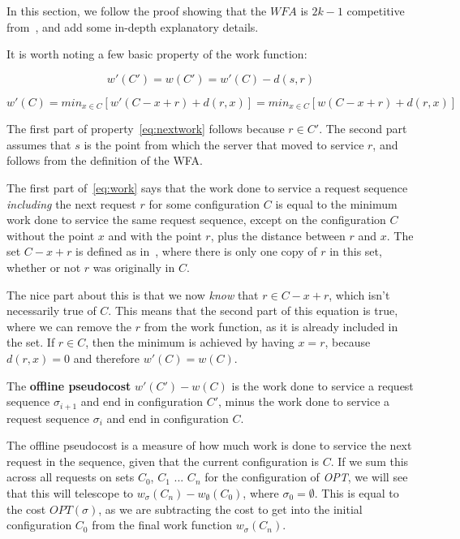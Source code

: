 In this section, we follow the proof showing that the $WFA$ is $2k-1$ competitive from~\cite{OnlineComp1998}, and add some in-depth explanatory details. 

It is worth noting a few basic property of the work function:

\begin{equation}
    \label{eq:nextwork}
    w'(C') = w(C') = w'(C) - d(s,r)
\end{equation}

\begin{equation}
    \label{eq:work}
    w'(C) = min_{x \in C} [w'(C - x + r) + d(r, x)] = min_{x \in C} [w(C - x + r) + d(r, x)]
\end{equation}

The first part of property~\ref{eq:nextwork} follows because $r \in C'$. The second part assumes that $s$ is the point from which the server that moved to service $r$, and follows from the definition of the WFA.

The first part of~\ref{eq:work} says that the work done to service a request sequence \textit{including} the next request $r$ for some configuration $C$ is equal to the minimum work done to service the same request sequence, except on the configuration $C$ without the point $x$ and with the point $r$, plus the distance between $r$ and $x$. The set $C-x+r$ is defined as in~\cite{OnlineComp1998}, where there is only one copy of $r$ in this set, whether or not $r$ was originally in $C$. 

The nice part about this is that we now \textit{know} that $r \in C - x + r$, which isn't necessarily true of $C$. This means that the second part of this equation is true, where we can remove the $r$ from the work function, as it is already included in the set. If $r \in C$, then the minimum is achieved by having $x = r$, because $d(r,x) = 0$ and therefore $w'(C) = w(C)$.

\begin{definition}
    The \textbf{offline pseudocost} $w'(C') - w(C)$ is the work done to service a request sequence $\sigma_{i+1}$ and end in configuration $C'$, minus the work done to service a request sequence $\sigma_i$ and end in configuration $C$.
\end{definition}

The offline pseudocost is a measure of how much work is done to service the next request in the sequence, given that the current configuration is $C$. If we sum this across all requests on sets $C_0$, $C_1$ ... $C_n$ for the configuration of \textit{OPT}, we will see that this will telescope to $w_{\sigma}(C_n) - w_{\emptyset}(C_0)$, where $\sigma_0 = \emptyset$. This is equal to the cost $OPT(\sigma)$, as we are subtracting the cost to get into the initial configuration $C_0$ from the final work function $w_\sigma(C_n)$.


